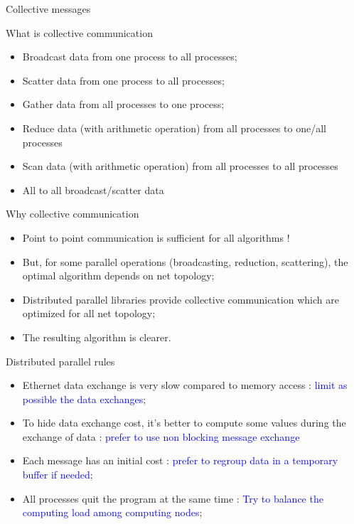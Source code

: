 \documentclass[compress,10pt,aspectratio=169]{beamer}
\begin{document}
\begin{frame}[fragile]{Collective messages}
\scriptsize
\begin{exampleblock}{\scriptsize What is collective communication}
    \begin{itemize}
        \item Broadcast data from one process to all processes;
        \item Scatter data from one process to all processes;
        \item Gather data from all processes to one process;
        \item Reduce data (with arithmetic operation) from all processes to one/all processes
        \item Scan data (with arithmetic operation) from all processes to all processes
        \item All to all broadcast/scatter data
    \end{itemize}
\end{exampleblock}

\begin{alertblock}{\scriptsize Why collective communication}
\begin{itemize}
    \item Point to point communication is sufficient for all algorithms !
    \item But, for some parallel operations (broadcasting, reduction, scattering), the optimal algorithm depends on net topology;
    \item Distributed parallel libraries provide collective communication which are optimized for all net topology;
    \item The resulting algorithm is clearer.
\end{itemize}
\end{alertblock}
\end{frame}

\begin{frame}[fragile]{Distributed parallel rules}

    \begin{itemize}
        \item Ethernet data exchange is very slow compared to memory access : \textcolor{blue}{limit as possible the data exchanges};
        \item To hide data exchange cost, it's better to compute some values during the exchange of data : \textcolor{blue}{prefer to use non blocking message exchange}
        \item Each message has an initial cost : \textcolor{blue}{prefer to regroup data in a temporary buffer if needed};
        \item All processes quit the program at the same time : \textcolor{blue}{Try to balance the computing load among computing nodes};
    \end{itemize}
\end{frame}
\end{document}
